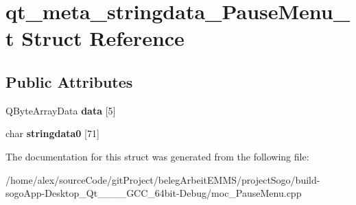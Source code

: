\hypertarget{structqt__meta__stringdata__PauseMenu__t}{\section{qt\-\_\-meta\-\_\-stringdata\-\_\-\-Pause\-Menu\-\_\-t Struct Reference}
\label{structqt__meta__stringdata__PauseMenu__t}
}
\subsection*{Public Attributes}
\begin{DoxyCompactItemize}
\item 
\hypertarget{structqt__meta__stringdata__PauseMenu__t_aef5b3991c23cd6044591c01cb2035821}{Q\-Byte\-Array\-Data {\bfseries data} \mbox{[}5\mbox{]}}\label{structqt__meta__stringdata__PauseMenu__t_aef5b3991c23cd6044591c01cb2035821}

\item 
\hypertarget{structqt__meta__stringdata__PauseMenu__t_ae9269ec9964e25033735daf2491ecf03}{char {\bfseries stringdata0} \mbox{[}71\mbox{]}}\label{structqt__meta__stringdata__PauseMenu__t_ae9269ec9964e25033735daf2491ecf03}

\end{DoxyCompactItemize}


The documentation for this struct was generated from the following file\-:\begin{DoxyCompactItemize}
\item 
/home/alex/source\-Code/git\-Project/beleg\-Arbeit\-E\-M\-M\-S/project\-Sogo/build-\/sogo\-App-\/\-Desktop\-\_\-\-Qt\-\_\-\_\-\_\-\_\-\-G\-C\-C\-\_\-64bit-\/\-Debug/moc\-\_\-\-Pause\-Menu.\-cpp\end{DoxyCompactItemize}

